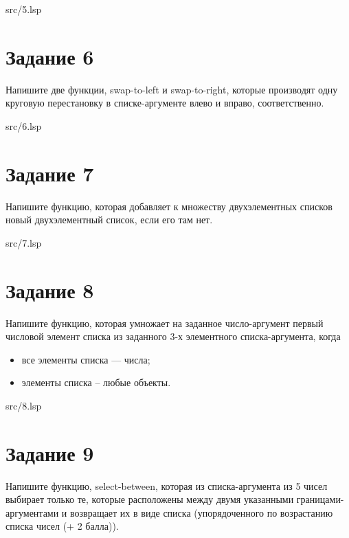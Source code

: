 \FloatBarrier
\begin{lstinputlisting}[style={lsp}]{src/5.lsp}
\end{lstinputlisting}
\FloatBarrier

\section*{Задание 6}
Напишите две функции, swap-to-left и swap-to-right, которые производят одну круговую
перестановку в списке-аргументе влево и вправо, соответственно.

\FloatBarrier
\begin{lstinputlisting}[style={lsp}]{src/6.lsp}
\end{lstinputlisting}
\FloatBarrier

\clearpage

\section*{Задание 7}
Напишите функцию, которая добавляет к множеству двухэлементных списков новый
двухэлементный список, если его там нет.

\FloatBarrier
\begin{lstinputlisting}[style={lsp}]{src/7.lsp}
\end{lstinputlisting}
\FloatBarrier


\section*{Задание 8}
Напишите функцию, которая умножает на заданное число-аргумент первый числовой
элемент списка из заданного 3-х элементного списка-аргумента, когда
\begin{itemize}
	\item все элементы списка --- числа;
	\item элементы списка -- любые объекты.
\end{itemize}

\FloatBarrier
\begin{lstinputlisting}[style={lsp}]{src/8.lsp}
\end{lstinputlisting}
\FloatBarrier


\section*{Задание 9}
Напишите функцию, select-between, которая из списка-аргумента из 5 чисел выбирает
только те, которые расположены между двумя указанными границами-аргументами и
возвращает их в виде списка (упорядоченного по возрастанию списка чисел (+ 2 балла)).

